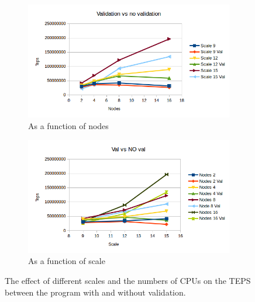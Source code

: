 \begin{figure}[!h]
\centering
\begin{subfigure}{.5\textwidth}
  \centering
  \includegraphics[width=\linewidth]{images/nodes_scale_vs_noscale.png}
  \caption{As a function of nodes}
  \label{fig:nodes_val_noval}
\end{subfigure}%
\begin{subfigure}{.5\textwidth}
  \centering
  \includegraphics[width=\linewidth]{images/scale_val_vs_noval.png}
  \caption{As a function of scale}
  \label{fig:scale_val_noval}
\end{subfigure}
\caption{The effect of different scales and the numbers of CPUs on the TEPS between the program with and without validation.}
\label{fig:val_vs_noval}
\end{figure}


